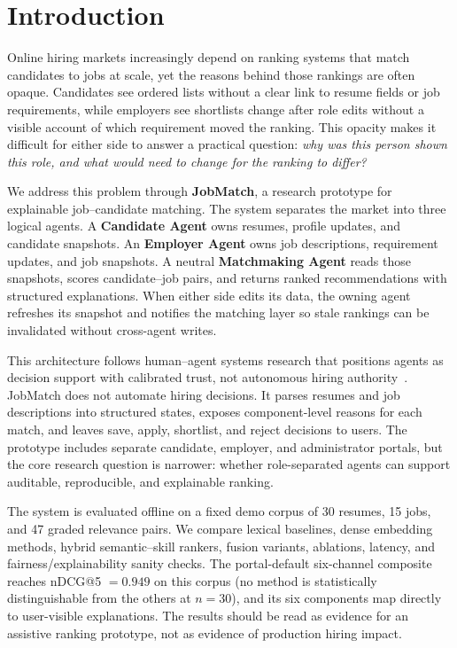 \section{Introduction}\label{sec:1}

Online hiring markets increasingly depend on ranking systems that match candidates to jobs at scale, yet the reasons behind those rankings are often opaque.
Candidates see ordered lists without a clear link to resume fields or job requirements, while employers see shortlists change after role edits without a visible account of which requirement moved the ranking.
This opacity makes it difficult for either side to answer a practical question: \emph{why was this person shown this role, and what would need to change for the ranking to differ?}

We address this problem through \textbf{JobMatch}, a research prototype for explainable job--candidate matching.
The system separates the market into three logical agents.
A \textbf{Candidate Agent} owns resumes, profile updates, and candidate snapshots.
An \textbf{Employer Agent} owns job descriptions, requirement updates, and job snapshots.
A neutral \textbf{Matchmaking Agent} reads those snapshots, scores candidate--job pairs, and returns ranked recommendations with structured explanations.
When either side edits its data, the owning agent refreshes its snapshot and notifies the matching layer so stale rankings can be invalidated without cross-agent writes.

This architecture follows human--agent systems research that positions agents as decision support with calibrated trust, not autonomous hiring authority~\cite{Rosenfeld2019HAS}.
JobMatch does not automate hiring decisions.
It parses resumes and job descriptions into structured states, exposes component-level reasons for each match, and leaves save, apply, shortlist, and reject decisions to users.
The prototype includes separate candidate, employer, and administrator portals, but the core research question is narrower: whether role-separated agents can support auditable, reproducible, and explainable ranking.

The system is evaluated offline on a fixed demo corpus of 30 resumes, 15 jobs, and 47 graded relevance pairs.
We compare lexical baselines, dense embedding methods, hybrid semantic--skill rankers, fusion variants, ablations, latency, and fairness/explainability sanity checks.
The portal-default six-channel composite reaches nDCG@5 $= 0.949$ on this corpus (no method is statistically distinguishable from the others at $n{=}30$), and its six components map directly to user-visible explanations.
The results should be read as evidence for an assistive ranking prototype, not as evidence of production hiring impact.

